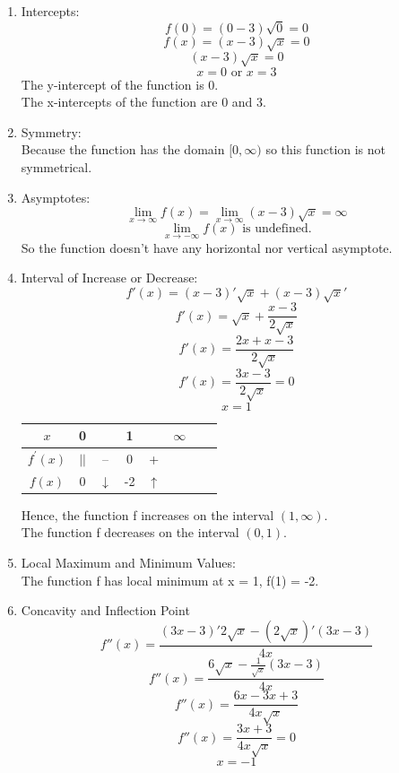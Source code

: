 \documentclass[12pt]{article}
\begin{document}
\begin{enumerate}
\begin{enumerate}
        \item Intercepts:
            \[f(0) = (0 - 3)\sqrt{0} = 0\]
            \[f(x) = (x-3)\sqrt{x} = 0\]
            \[(x-3)\sqrt{x} = 0\]
            \[x = 0 \text{ or } x = 3\]
            The y-intercept of the function is 0.\\
            The x-intercepts of the function are 0 and 3.
        \item Symmetry:\\
            Because the function has the domain $[0,\infty)$ so this function is not symmetrical.
        \item Asymptotes:
            \[\lim_{x \to \infty} f(x) = \lim_{x \to \infty} (x-3)\sqrt{x} = \infty \]
            \[\lim_{x \to -\infty} f(x) \text{ is undefined.}\] 
            So the function doesn't have any horizontal nor vertical asymptote.
        \item Interval of Increase or Decrease:
            \[f'(x) = (x-3)'\sqrt{x} + (x-3)\sqrt{x}'\]
            \[f'(x) = \sqrt{x} + \frac{x-3}{2\sqrt{x}}\]
            \[f'(x) = \frac{2x + x-3}{2\sqrt{x}}\]
            \[f'(x) = \frac{3x-3}{2\sqrt{x}} = 0\]
            \[x = 1\]
            \begin{center}
                \begin{tabular}{c c c c c c c c}
                    $x$  & 0 & ~ &1 & ~ & $\infty$ \\ 
                    \hline 
                    $f^{\prime} (x)$ & $||$ & -- & 0 & + \\ 
                    \hline 
                    $f(x)$ & 0 & $\downarrow$ & -2 & $\uparrow$ & \\ 
                \end{tabular}    
            \end{center}
            Hence, the function f increases on the interval $(1,\infty)$.\\
            The function f decreases on the interval $(0,1)$.
        \item Local Maximum and Minimum Values:\\
            The function f has local minimum at x = 1, f(1) = -2.
        \item Concavity and Inflection Point
            \[f''(x) = \frac{(3x-3)'2\sqrt{x} - (2\sqrt{x})'(3x-3)}{4x}\]
            \[f''(x) = \frac{6\sqrt{x} - \frac{1}{\sqrt{x}}(3x-3)}{4x}\]
            \[f''(x) = \frac{6x - 3x + 3}{4x\sqrt{x}}\]
            \[f''(x) = \frac{3x + 3}{4x\sqrt{x}} = 0\]
            \[x = -1\]
            \begin{center}

\end{center}
\end{enumerate}
\end{enumerate}
\end{document}
